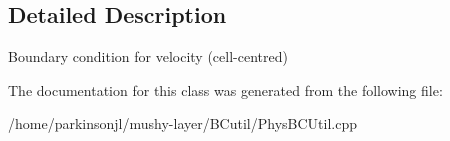 \subsection{Detailed Description}
Boundary condition for velocity (cell-\/centred) 

The documentation for this class was generated from the following file\+:\begin{DoxyCompactItemize}
\item 
/home/parkinsonjl/mushy-\/layer/\+B\+Cutil/Phys\+B\+C\+Util.\+cpp\end{DoxyCompactItemize}
